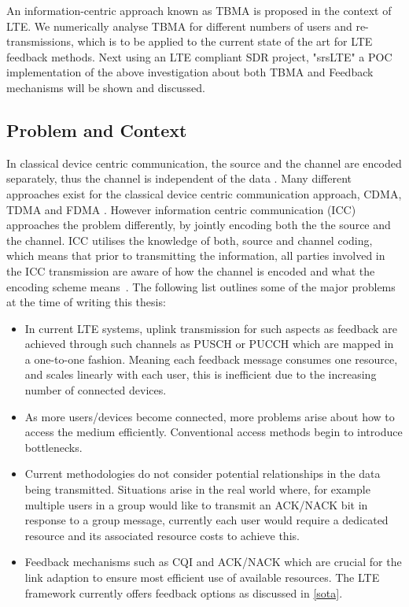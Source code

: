 \documentclass{article}
\begin{document}
An information-centric approach known as \ac{TBMA} is proposed in the context of LTE. We numerically analyse \ac{TBMA} for different numbers of users and re-transmissions, which is to be applied to the current state of the art for LTE feedback methods. Next using an LTE compliant SDR project, "srsLTE" a \ac{POC} implementation of the above investigation about both \ac{TBMA} and Feedback mechanisms will be shown and discussed. 


\subsection{Problem and Context}\label{prob_context}
In classical device centric communication, the source and the channel are encoded separately, thus the channel is independent of the data \cite{shannon_theory}. Many different approaches exist for the classical device centric communication approach, \ac{CDMA}, \ac{TDMA} and \ac{FDMA}
\cite{multiple_access_protocols}.  However information centric communication (ICC) approaches the problem differently, by jointly encoding both the the source and the channel. ICC utilises the knowledge of both, source  and channel coding, which means that prior to transmitting the information, all parties involved in the ICC transmission are aware of how the channel is encoded and what the encoding scheme means~\cite{information_centric}. The following list outlines some of the major problems at the time of writing this thesis:
\begin{itemize}
  \item In current LTE systems, uplink transmission for such aspects as feedback are achieved through such channels as \ac{PUSCH} or \ac{PUCCH} which are mapped in a one-to-one fashion. Meaning each feedback message consumes one resource, and scales linearly with each user, this is inefficient due to the increasing number of connected devices. 
  \item As more users/devices become connected, more problems arise about how to access the medium efficiently. Conventional access methods begin to introduce bottlenecks.
  \item Current methodologies do not consider potential relationships in the data being transmitted. Situations arise in the real world where, for example multiple users in a group would like to transmit an \ac{ACK/NACK} bit in response to a group message, currently each user would require a dedicated resource and its associated resource costs to achieve this.
  \item Feedback mechanisms such as CQI and ACK/NACK which are crucial for the link adaption to ensure most efficient use of available resources. The LTE framework currently offers feedback options as discussed in \cref{sota}.
\end{itemize}
\end{document}
